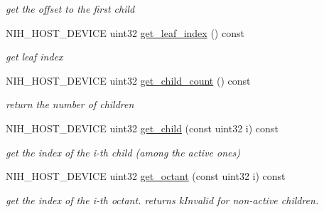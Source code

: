 \begin{DoxyCompactItemize}
\begin{DoxyCompactList}\small\item\em get the offset to the first child \end{DoxyCompactList}\item 
\hypertarget{structnih_1_1_octree__node_a961347c5105eea36e54f180cb07d0ceb}{
\-N\-I\-H\-\_\-\-H\-O\-S\-T\-\_\-\-D\-E\-V\-I\-C\-E uint32 \hyperlink{structnih_1_1_octree__node_a961347c5105eea36e54f180cb07d0ceb}{get\-\_\-leaf\-\_\-index} () const }
\label{structnih_1_1_octree__node_a961347c5105eea36e54f180cb07d0ceb}

\begin{DoxyCompactList}\small\item\em get leaf index \end{DoxyCompactList}\item 
\hypertarget{structnih_1_1_octree__node_aaa91c8f56a78a8b4d137c1edc5ae41f9}{
\-N\-I\-H\-\_\-\-H\-O\-S\-T\-\_\-\-D\-E\-V\-I\-C\-E uint32 \hyperlink{structnih_1_1_octree__node_aaa91c8f56a78a8b4d137c1edc5ae41f9}{get\-\_\-child\-\_\-count} () const }
\label{structnih_1_1_octree__node_aaa91c8f56a78a8b4d137c1edc5ae41f9}

\begin{DoxyCompactList}\small\item\em return the number of children \end{DoxyCompactList}\item 
\hypertarget{structnih_1_1_octree__node_a5787f84f0e9f800c99f21f26dbe1f206}{
\-N\-I\-H\-\_\-\-H\-O\-S\-T\-\_\-\-D\-E\-V\-I\-C\-E uint32 \hyperlink{structnih_1_1_octree__node_a5787f84f0e9f800c99f21f26dbe1f206}{get\-\_\-child} (const uint32 i) const }
\label{structnih_1_1_octree__node_a5787f84f0e9f800c99f21f26dbe1f206}

\begin{DoxyCompactList}\small\item\em get the index of the i-\/th child (among the active ones) \end{DoxyCompactList}\item 
\hypertarget{structnih_1_1_octree__node_a3a77af009319153a66aacc6a3269a7e4}{
\-N\-I\-H\-\_\-\-H\-O\-S\-T\-\_\-\-D\-E\-V\-I\-C\-E uint32 \hyperlink{structnih_1_1_octree__node_a3a77af009319153a66aacc6a3269a7e4}{get\-\_\-octant} (const uint32 i) const }
\label{structnih_1_1_octree__node_a3a77af009319153a66aacc6a3269a7e4}

\begin{DoxyCompactList}\small\item\em get the index of the i-\/th octant. returns k\-Invalid for non-\/active children. \end{DoxyCompactList}\end{DoxyCompactItemize}
